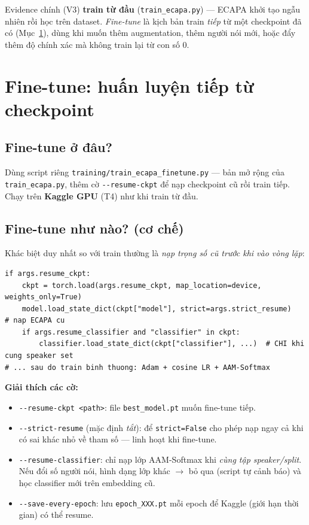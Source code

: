 \documentclass[12pt,a4paper]{article}
\begin{document}
\begin{diembox}
Evidence chính (V3) \textbf{train từ đầu} (\texttt{train\_ecapa.py}) --- ECAPA khởi
tạo ngẫu nhiên rồi học trên dataset. \emph{Fine-tune} là kịch bản train \emph{tiếp}
từ một checkpoint đã có (Mục~\ref{sec:finetune}), dùng khi muốn thêm augmentation,
thêm người nói mới, hoặc đẩy thêm độ chính xác mà không train lại từ con số 0.
\end{diembox}

\section{Fine-tune: huấn luyện tiếp từ checkpoint}
\label{sec:finetune}
\subsection{Fine-tune ở đâu?}
Dùng script riêng \texttt{training/train\_ecapa\_finetune.py} --- bản mở rộng của
\texttt{train\_ecapa.py}, thêm cờ \texttt{-{}-resume-ckpt} để nạp checkpoint cũ rồi
train tiếp. Chạy trên \textbf{Kaggle GPU} (T4) như khi train từ đầu.

\subsection{Fine-tune như nào? (cơ chế)}
Khác biệt duy nhất so với train thường là \emph{nạp trọng số cũ trước khi vào vòng
lặp}:
\begin{lstlisting}
if args.resume_ckpt:
    ckpt = torch.load(args.resume_ckpt, map_location=device, weights_only=True)
    model.load_state_dict(ckpt["model"], strict=args.strict_resume)   # nap ECAPA cu
    if args.resume_classifier and "classifier" in ckpt:
        classifier.load_state_dict(ckpt["classifier"], ...)  # CHI khi cung speaker set
# ... sau do train binh thuong: Adam + cosine LR + AAM-Softmax
\end{lstlisting}

\textbf{Giải thích các cờ:}
\begin{itemize}
  \item \texttt{-{}-resume-ckpt <path>}: file \texttt{best\_model.pt} muốn fine-tune tiếp.
  \item \texttt{-{}-strict-resume} (mặc định \emph{tắt}): để \texttt{strict=False} cho
  phép nạp ngay cả khi có sai khác nhỏ về tham số --- linh hoạt khi fine-tune.
  \item \texttt{-{}-resume-classifier}: chỉ nạp lớp AAM-Softmax khi \emph{cùng tập
  speaker/split}. Nếu đổi số người nói, hình dạng lớp khác $\to$ bỏ qua (script tự
  cảnh báo) và học classifier mới trên embedding cũ.
  \item \texttt{-{}-save-every-epoch}: lưu \texttt{epoch\_XXX.pt} mỗi epoch để Kaggle
  (giới hạn thời gian) có thể resume.
\end{itemize}
\end{document}
